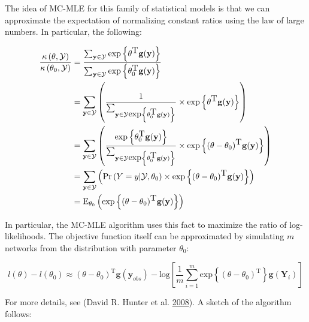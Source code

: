 \documentclass[]{book}
\begin{document}
The idea of MC-MLE for this family of statistical models is that we can approximate the expectation of normalizing constant ratios using the law of large numbers. In particular, the following:

\begin{align*}
\frac{\kappa\left(\theta,\mathcal{Y}\right)}{\kappa\left(\theta_0,\mathcal{Y}\right)} & = 
  \frac{
    \sum_{\mathbf{y}\in\mathcal{Y}}\mbox{exp}\left\{\theta^{\mbox{T}}\mathbf{g}(\mathbf{y})\right\}}{ 
    \sum_{\mathbf{y}\in\mathcal{Y}}\mbox{exp}\left\{\theta_0^{\mbox{T}}\mathbf{g}(\mathbf{y})\right\} 
  } \\
& = \sum_{\mathbf{y}\in\mathcal{Y}}\left( %
  \frac{1}{%
    \sum_{\mathbf{y}\in\mathcal{Y}\mbox{exp}\left\{\theta_0^{\mbox{T}}\mathbf{g}(\mathbf{y})\right\}}%
  } \times %
  \mbox{exp}\left\{\theta^{\mbox{T}}\mathbf{g}(\mathbf{y})\right\} %
  \right) \\
& = \sum_{\mathbf{y}\in\mathcal{Y}}\left( %
  \frac{\mbox{exp}\left\{\theta_0^{\mbox{T}}\mathbf{g}(\mathbf{y})\right\}}{%
    \sum_{\mathbf{y}\in\mathcal{Y}\mbox{exp}\left\{\theta_0^{\mbox{T}}\mathbf{g}(\mathbf{y})\right\}}%
  } \times %
  \mbox{exp}\left\{(\theta - \theta_0)^{\mbox{T}}\mathbf{g}(\mathbf{y})\right\} %
  \right) \\
& = \sum_{\mathbf{y}\in\mathcal{Y}}\left( %
  \mbox{Pr}\left(Y = y|\mathcal{Y}, \theta_0\right) \times %
  \mbox{exp}\left\{(\theta - \theta_0)^{\mbox{T}}\mathbf{g}(\mathbf{y})\right\} %
  \right) \\
& = \mbox{E}_{\theta_0}\left(\mbox{exp}\left\{(\theta - \theta_0)^{\mbox{T}}\mathbf{g}(\mathbf{y})\right\} \right)
\end{align*}

In particular, the MC-MLE algorithm uses this fact to maximize the ratio of log-likelihoods. The objective function itself can be approximated by simulating \(m\) networks from the distribution with parameter \(\theta_0\):

\[
l(\theta) - l(\theta_0) \approx (\theta - \theta_0)^{\mbox{T}}\mathbf{g}(\mathbf{y}_{obs}) - 
\mbox{log}{\left[\frac{1}{m}\sum_{i = 1}^m\mbox{exp}\left\{(\theta-\theta_0)^{\mbox{T}}\right\}\mathbf{g}(\mathbf{Y}_i)\right]}
\]

For more details, see (David R. Hunter et al. \protect\hyperlink{ref-Hunter2008}{2008}). A sketch of the algorithm follows:
\end{document}
